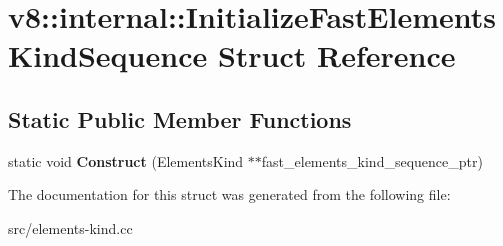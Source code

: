 \hypertarget{structv8_1_1internal_1_1_initialize_fast_elements_kind_sequence}{}\section{v8\+:\+:internal\+:\+:Initialize\+Fast\+Elements\+Kind\+Sequence Struct Reference}
\label{structv8_1_1internal_1_1_initialize_fast_elements_kind_sequence}
\subsection*{Static Public Member Functions}
\begin{DoxyCompactItemize}
\item 
\hypertarget{structv8_1_1internal_1_1_initialize_fast_elements_kind_sequence_a38d945d0d5dd0ca49928625e503b7db4}{}static void {\bfseries Construct} (Elements\+Kind $\ast$$\ast$fast\+\_\+elements\+\_\+kind\+\_\+sequence\+\_\+ptr)\label{structv8_1_1internal_1_1_initialize_fast_elements_kind_sequence_a38d945d0d5dd0ca49928625e503b7db4}

\end{DoxyCompactItemize}


The documentation for this struct was generated from the following file\+:\begin{DoxyCompactItemize}
\item 
src/elements-\/kind.\+cc\end{DoxyCompactItemize}
